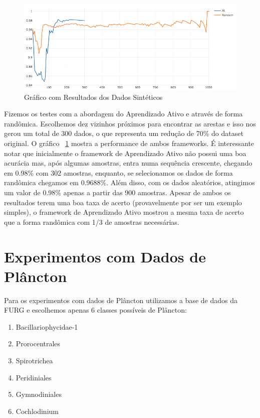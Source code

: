 \begin{figure}
  \centering
  \includegraphics[width=1.0\textwidth]{figures/grafico_exemplo_sintetico.png}
  \caption{Gráfico com Resultados dos Dados Sintéticos}
  \label{fig:grafico_exemplo_sintetico}
\end{figure}

Fizemos os testes com a abordagem do Aprendizado Ativo e através de forma randômica. Escolhemos dez vizinhos próximos para encontrar as arestas e isso nos gerou um total de 300 dados, o que representa um redução de 70\% do dataset original. O gráfico ~\ref{fig:grafico_exemplo_sintetico} mostra a performance de ambos frameworks. É interessante notar que inicialmente o framework de Aprendizado Ativo não possui uma boa acurácia mas, após algumas amostras, entra numa sequência crescente, chegando em 0.98\% com 302 amostras, enquanto, se selecionamos os dados de forma randômica chegamos em 0.9688\%. Além disso, com os dados aleatórios, atingimos um valor de 0.98\% apenas a partir das 900 amostras. Apesar de ambos os resultados terem uma boa taxa de acerto (provavelmente por ser um exemplo simples), o framework de Aprendizado Ativo mostrou a mesma taxa de acerto que a forma randômica com 1/3 de amostras necessárias. 


\section{Experimentos com Dados de Plâncton}
\label{sec:experimentos_plancton}

Para os experimentos com dados de Plâncton utilizamos a base de dados da FURG e escolhemos apenas 6 classes possíveis de Plâncton: 

\begin{enumerate}
  \item Bacillariophycidae-1
  \item Prorocentrales
  \item Spirotrichea
  \item Peridiniales
  \item Gymnodiniales
  \item Cochlodinium
\end{enumerate}






